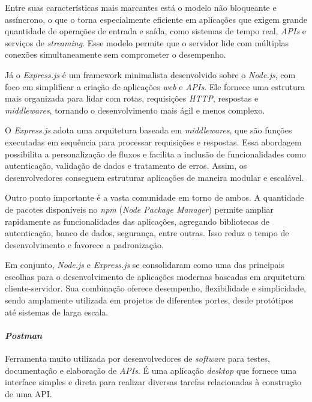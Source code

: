 \documentclass[english,brazilian]{UNISINOSartigo} %
\begin{document}
Entre suas características mais marcantes está o modelo não bloqueante e assíncrono, o que o torna especialmente eficiente em aplicações que exigem grande quantidade de operações de entrada e saída, como sistemas de tempo real, \textit{APIs} e serviços de \textit{streaming}. Esse modelo permite que o servidor lide com múltiplas conexões simultaneamente sem comprometer o desempenho.

Já o \textit{Express.js} é um framework minimalista desenvolvido sobre o \textit{Node.js}, com foco em simplificar a criação de aplicações \textit{web} e \textit{APIs}. Ele fornece uma estrutura mais organizada para lidar com rotas, requisições \textit{HTTP}, respostas e \textit{middlewares}, tornando o desenvolvimento mais ágil e menos complexo.

O \textit{Express.js} adota uma arquitetura baseada em \textit{middlewares}, que são funções executadas em sequência para processar requisições e respostas. Essa abordagem possibilita a personalização de fluxos e facilita a inclusão de funcionalidades como autenticação, validação de dados e tratamento de erros. Assim, os desenvolvedores conseguem estruturar aplicações de maneira modular e escalável.

Outro ponto importante é a vasta comunidade em torno de ambos. A quantidade de pacotes disponíveis no \textit{npm} (\textit{Node Package Manager}) permite ampliar rapidamente as funcionalidades das aplicações, agregando bibliotecas de autenticação, banco de dados, segurança, entre outras. Isso reduz o tempo de desenvolvimento e favorece a padronização.

Em conjunto, \textit{Node.js} e \textit{Express.js} se consolidaram como uma das principais escolhas para o desenvolvimento de aplicações modernas baseadas em arquitetura cliente-servidor. Sua combinação oferece desempenho, flexibilidade e simplicidade, sendo amplamente utilizada em projetos de diferentes portes, desde protótipos até sistemas de larga escala.

\paragraph{\textit{Postman}}

Ferramenta muito utilizada por desenvolvedores de \textit{software} para testes, documentação e elaboração de \textit{APIs}. É uma aplicação \textit{desktop} que fornece uma interface simples e direta para realizar diversas tarefas relacionadas à construção de uma API.
\end{document}
